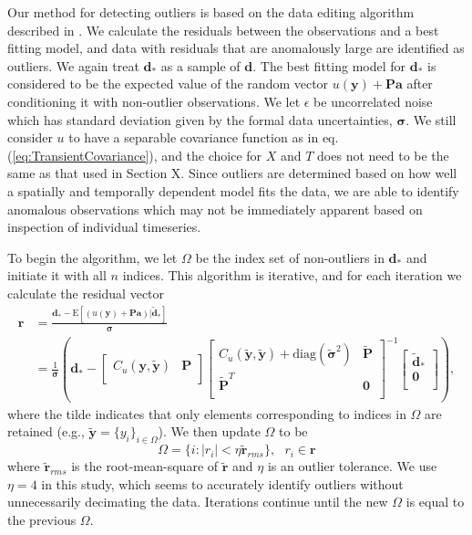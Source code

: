 \documentclass[10pt,a4paper]{article}
\begin{document}
Our method for detecting outliers is based on the data editing algorithm described in \citet{Gibbs2011}. We calculate the residuals between the observations and a best fitting model, and data with residuals that are anomalously large are identified as outliers. We again treat $\bm{d}_*$ as a sample of $\bm{d}$. The best fitting model for $\bm{d}_*$ is considered to be the expected value of the random vector $u(\bm{y}) + \bm{P}\bm{a}$ after conditioning it with non-outlier observations. We let $\epsilon$ be uncorrelated noise which has standard deviation given by the formal data uncertainties, $\bm{\sigma}$.  We still consider $u$ to have a separable covariance function as in eq. (\ref{eq:TransientCovariance}), and the choice for $X$ and $T$ does not need to be the same as that used in Section X. Since outliers are determined based on how well a spatially and temporally dependent model fits the data, we are able to identify anomalous observations which may not be immediately apparent based on inspection of individual timeseries. 

To begin the algorithm, we let $\Omega$ be the index set of non-outliers in $\bm{d}_*$ and initiate it with all $n$ indices. This algorithm is iterative, and for each iteration we calculate the residual vector
\begin{align}\label{eq:Residual}
\bm{r} &= \frac{\bm{d}_* - \mathrm{E}\left[(u(\bm{y}) + \bm{P}\bm{a})|\tilde{\bm{d}}_* \right]}{\bm{\sigma}} \\
       &= \frac{1}{\bm{\sigma}}\left(\bm{d}_*  - 
\left[ 
\begin{array}{cc}
C_u(\bm{y},\tilde{\bm{y}}) & \bm{P} \\
\end{array}
\right]
\left[
\begin{array}{cc}
C_u(\tilde{\bm{y}},\tilde{\bm{y}}) + \mathrm{diag}(\tilde{\bm{\sigma}}^2) & \tilde{\bm{P}} \\
\tilde{\bm{P}}^T  & \bm{0} \\
\end{array}
\right]^{-1}
\left[
\begin{array}{c}
\tilde{\bm{d}}_* \\
\bm{0} \\
\end{array}
\right] 
\right),
\end{align}
where the tilde indicates that only elements corresponding to indices in $\Omega$ are retained (e.g., $\tilde{\bm{y}} = \{y_i\}_{i\in\Omega}$). We then update $\Omega$ to be
\begin{equation}\label{eq:Update}
\Omega = \{i : |r_i| < \eta \tilde{\bm{r}}_{rms}\}, \ \ \ r_i \in \bm{r}
\end{equation} 
where $\tilde{\bm{r}}_{rms}$ is the root-mean-square of $\tilde{\bm{r}}$ and $\eta$ is an outlier tolerance. We use $\eta=4$ in this study, which seems to accurately identify outliers without unnecessarily decimating the data. Iterations continue until the new $\Omega$ is equal to the previous $\Omega$. 
\end{document}
